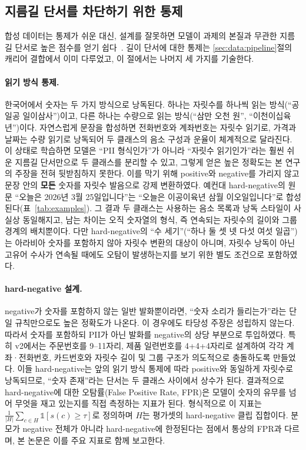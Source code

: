 \documentclass[11pt]{article}
\renewcommand{\emph}[1]{\textbf{#1}}
\begin{document}
\subsection{지름길 단서를 차단하기 위한 통제}\label{sec:data:control}
합성 데이터는 통제가 쉬운 대신, 설계를 잘못하면 모델이 과제의 본질과 무관한 지름길
단서로 높은 점수를 얻기 쉽다~\cite{geirhos2020shortcut}. 길이 단서에 대한 통제는
\ref{sec:data:pipeline}절의 캐리어 결합에서 이미 다루었고, 이 절에서는 나머지 세 가지를
기술한다.

\paragraph{읽기 방식 통제.}
한국어에서 숫자는 두 가지 방식으로 낭독된다. 하나는 자릿수를 하나씩 읽는 방식(``공일공
일이삼사'')이고, 다른 하나는 수량으로 읽는 방식(``삼만 오천 원'', ``이천이십육 년'')이다.
자연스럽게 문장을 합성하면 전화번호와 계좌번호는 자릿수 읽기로, 가격과 날짜는 수량 읽기로
낭독되어 두 클래스의 음소 구성과 운율이 체계적으로 달라진다. 이 상태로 학습하면 모델은
``PII 형식인가''가 아니라 ``자릿수 읽기인가''라는 훨씬 쉬운 지름길 단서만으로 두 클래스를
분리할 수 있고, 그렇게 얻은 높은 정확도는 본 연구의 주장을 전혀 뒷받침하지 못한다. 이를
막기 위해 positive와 negative를 가리지 않고 문장 안의 \emph{모든} 숫자를 자릿수 발음으로
강제 변환하였다. 예컨대 hard-negative의 원문 ``오늘은 2026년 3월 25일입니다''는 ``오늘은
이공이육년 삼월 이오일입니다''로 합성된다(표~\ref{tab:examples}). 그 결과 두 클래스는
사용하는 음소 목록과 낭독 스타일이 사실상 동일해지고, 남는 차이는 오직 숫자열의 형식, 즉
연속되는 자릿수의 길이와 그룹 경계의 배치뿐이다. 다만 hard-negative의 ``수 세기''(``하나 둘
셋 넷 다섯 여섯 일곱'')는 아라비아 숫자를 포함하지 않아 자릿수 변환의 대상이 아니며, 자릿수
낭독이 아닌 고유어 수사가 연속될 때에도 오탐이 발생하는지를 보기 위한 별도 조건으로
포함하였다.

\paragraph{hard-negative 설계.}
negative가 숫자를 포함하지 않는 일반 발화뿐이라면, ``숫자 소리가 들리는가''라는 단일
규칙만으로도 높은 정확도가 나온다. 이 경우에도 타당성 주장은 성립하지 않는다. 따라서
숫자를 포함하되 PII가 아닌 발화를 negative의 상당 부분으로 투입하였다. 특히 v2에서는
주문번호를 9--11자리, 제품 일련번호를 4+4+4자리로 설계하여 각각 계좌·전화번호, 카드번호와
자릿수 길이 및 그룹 구조가 의도적으로 충돌하도록 만들었다. 이들 hard-negative는 앞의 읽기
방식 통제에 따라 positive와 동일하게 자릿수로 낭독되므로, ``숫자 존재''라는 단서는 두 클래스
사이에서 상수가 된다. 결과적으로 hard-negative에 대한 오탐률(False Positive Rate, FPR)은
모델이 숫자의 유무를 넘어 무엇을 재고 있는지를 직접 측정하는 지표가 된다. 형식적으로 이
지표는 $\frac{1}{|H|}\sum_{c\in H}\mathbb{1}[s(c)\ge\tau]$로 정의하며 $H$는 평가셋의
hard-negative 클립 집합이다. 분모가 negative 전체가 아니라 hard-negative에 한정된다는 점에서
통상의 FPR과 다르며, 본 논문은 이를 주요 지표로 함께 보고한다.
\end{document}
